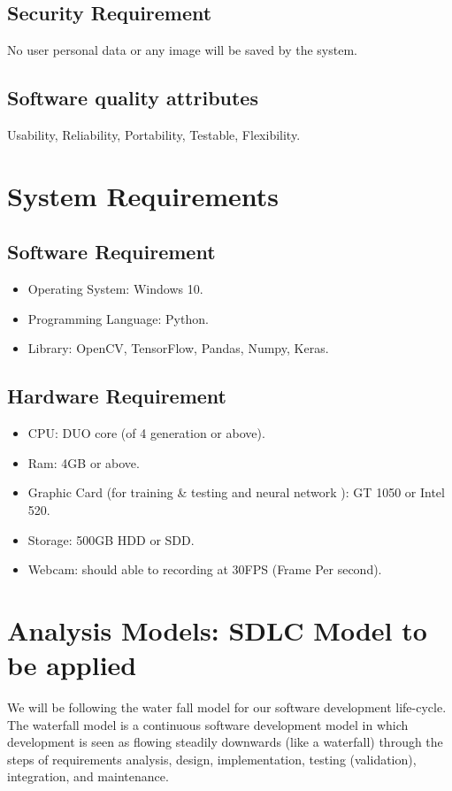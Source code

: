 \documentclass[oneside,a4paper,12pt]{report}
\begin{document}
        \subsection{Security Requirement}
        No user personal data or any image will be saved by the system.
        \subsection{Software quality attributes}
        Usability, Reliability, Portability, Testable, Flexibility.
        
    
    \section{System  Requirements }
        \subsection{Software Requirement}
            \begin{itemize}
        
                \item Operating System: Windows 10.
                \item Programming Language: Python.
                \item Library: OpenCV, TensorFlow, Pandas, Numpy, Keras.
                
    
            \end{itemize}
            \subsection{Hardware Requirement}
                \begin{itemize}
        
                    \item CPU: DUO core (of 4 generation or above).
                    \item Ram: 4GB or above.
                    \item Graphic Card (for training & testing and neural network ): GT 1050 or Intel 520.
                    \item Storage: 500GB HDD or SDD.
                    \item Webcam: should able to recording at 30FPS (Frame Per second).
    
                \end{itemize}
    
    
    \section{Analysis Models: SDLC Model to be applied}
        We will be following the water fall model for our software development life-cycle. The waterfall model is a continuous software development model in which development is seen as flowing steadily downwards (like a waterfall) through the steps of requirements analysis, design, implementation, testing (validation), integration, and maintenance.
\end{document}
